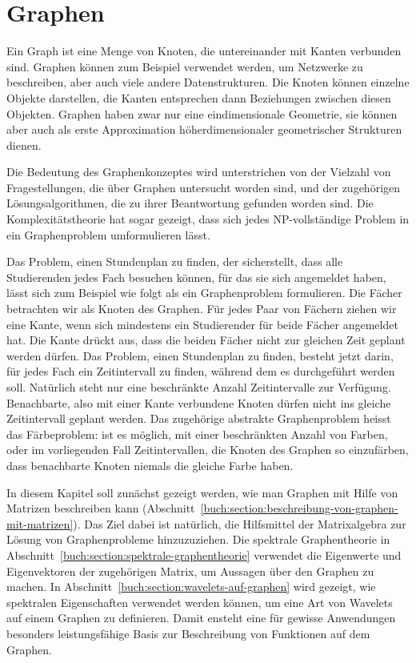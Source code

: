 %
%
%
\chapter{Graphen
\label{buch:chapter:graphen}}
\rhead{}
Ein Graph ist eine Menge von Knoten, die untereinander mit Kanten
verbunden sind.
%
Graphen können zum Beispiel verwendet werden, um Netzwerke zu beschreiben,
aber auch viele andere Datenstrukturen.
%
Die Knoten können einzelne Objekte darstellen, die Kanten entsprechen
dann Beziehungen zwischen diesen Objekten.
Graphen haben zwar nur eine eindimensionale Geometrie, sie können aber auch als
erste Approximation höherdimensionaler geometrischer Strukturen dienen.

Die Bedeutung des Graphenkonzeptes wird unterstrichen von der Vielzahl
von Fragestellungen, die über Graphen untersucht worden sind, und der
zugehörigen Lösungsalgorithmen, die zu ihrer Beantwortung gefunden
worden sind.
Die Komplexitätstheorie hat sogar gezeigt, dass sich jedes NP-vollständige
Problem in ein Graphenproblem umformulieren lässt.
%

Das Problem, einen Stundenplan zu finden, der sicherstellt, dass
%
alle Studierenden jedes Fach besuchen können, für das sie sich
angemeldet haben, lässt sich zum Beispiel wie folgt als ein
Graphenproblem formulieren.
Die Fächer betrachten wir als Knoten des Graphen.
Für jedes Paar von Fächern ziehen wir eine Kante, wenn 
sich mindestens ein Studierender für beide Fächer angemeldet hat.
Die Kante drückt aus, dass die beiden Fächer nicht zur gleichen Zeit
geplant werden dürfen.
Das Problem, einen Stundenplan zu finden, besteht jetzt darin, für
jedes Fach ein Zeit\-intervall zu finden, während dem es durchgeführt
werden soll.
Natürlich steht nur eine beschränkte Anzahl Zeitintervalle zur Verfügung.
Benachbarte, also mit einer Kante verbundene Knoten dürfen nicht
ins gleiche Zeitintervall geplant werden.
Das zugehörige abstrakte Graphenproblem heisst das Färbeproblem: 
%
ist es möglich, mit einer beschränkten Anzahl von Farben, oder im
vorliegenden Fall Zeitintervallen, die Knoten
des Graphen so einzufärben, dass benachbarte Knoten niemals die gleiche
Farbe haben.

In diesem Kapitel soll zunächst gezeigt werden, wie man Graphen mit 
Hilfe von Matrizen beschreiben kann
(Abschnitt~\ref{buch:section:beschreibung-von-graphen-mit-matrizen}).
Das Ziel dabei ist natürlich, die Hilfsmittel der Matrixalgebra
zur Lösung von Graphenprobleme hinzuzuziehen.
Die spektrale Graphentheorie in
Abschnitt~\ref{buch:section:spektrale-graphentheorie} verwendet
die Eigenwerte und Eigenvektoren der zugehörigen Matrix, um Aussagen
über den Graphen zu machen.
%
In Abschnitt~\ref{buch:section:wavelets-auf-graphen} wird gezeigt,
wie spektralen Eigenschaften verwendet werden können, um eine
Art von Wavelets auf einem Graphen zu definieren.
Damit ensteht eine für gewisse Anwendungen besonders leistungsfähige
Basis zur Beschreibung von Funktionen auf dem Graphen.






